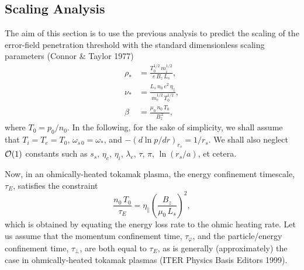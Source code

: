 \documentclass[notitlepage,12pt]{article}
\begin{document}
\subsection{Scaling Analysis}
The aim of this section is to use the previous analysis to predict the scaling of the error-field penetration
threshold with the standard dimensionless scaling parameters (Connor \& Taylor 1977)
\begin{align}
\rho_\ast &= \frac{T_0^{1/2}\,m_i^{1/2}}{e\,B_z\,L_s},\label{e428}\\[0.5ex]
\nu_\ast &= \frac{L_s\,n_0\,e^2\,\eta_\parallel}{m_e^{1/2}\,T_0^{1/2}},\\[0.5ex]
\beta&=\frac{\mu_0\,n_0\,T_0}{B_z^{\,2}},\label{e430}
\end{align}
where $T_0=p_0/n_0$. In the following, for the sake of simplicity, we
shall assume that $T_i=T_e=T_0$, $\omega_{s\,0}=\omega_\ast$, and $-(d\ln p/dr)_{r_s} = 1/r_s$. We shall also neglect ${\cal O}(1)$
constants such as $s_s$, $\eta_e$, $\eta_i$, $\lambda_e$, $\tau$, $\pi$, $\ln(r_s/a)$, et cetera.

 Now, in an ohmically-heated tokamak
plasma, the energy confinement timescale, $\tau_E$, satisfies the constraint
\begin{equation}
\frac{n_0\,T_0}{\tau_E} = \eta_\parallel\left(\frac{B_z}{\mu_0\,L_s}\right)^2,
\end{equation}
which is obtained by equating the energy loss rate to the ohmic heating rate. Let us assume that the momentum confinement
time, $\tau_\varphi$, and the particle/energy confinement time, $\tau_\perp$, are both equal to $\tau_E$, as is generally
(approximately) the case in ohmically-heated tokamak plasmas (ITER Physics Basis Editors 1999). 
\end{document}
